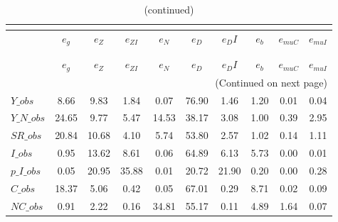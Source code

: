  
\begin{center}
\begin{longtable}{lccccccccc} 
\caption{VARIANCE DECOMPOSITION (in percent)}\\
 \label{Table:th_var_decomp_uncond}\\
\toprule 
$               $	 & 	 $        {e_g}$	 & 	 $        {e_Z}$	 & 	 $     {e_{ZI}}$	 & 	 $        {e_N}$	 & 	 $        {e_D}$	 & 	 $       {e_DI}$	 & 	 $        {e_b}$	 & 	 $    {e_{muC}}$	 & 	 $    {e_{muI}}$\\
\midrule \endfirsthead 
\caption{(continued)}\\
 \toprule \\ 
$               $	 & 	 $        {e_g}$	 & 	 $        {e_Z}$	 & 	 $     {e_{ZI}}$	 & 	 $        {e_N}$	 & 	 $        {e_D}$	 & 	 $       {e_DI}$	 & 	 $        {e_b}$	 & 	 $    {e_{muC}}$	 & 	 $    {e_{muI}}$\\
\midrule \endhead 
\midrule \multicolumn{10}{r}{(Continued on next page)} \\ \bottomrule \endfoot 
\bottomrule \endlastfoot 
$Y\_obs         $	 & 	         8.66	 & 	         9.83	 & 	         1.84	 & 	         0.07	 & 	        76.90	 & 	         1.46	 & 	         1.20	 & 	         0.01	 & 	         0.04 \\ 
$Y\_N\_obs      $	 & 	        24.65	 & 	         9.77	 & 	         5.47	 & 	        14.53	 & 	        38.17	 & 	         3.08	 & 	         1.00	 & 	         0.39	 & 	         2.95 \\ 
$SR\_obs        $	 & 	        20.84	 & 	        10.68	 & 	         4.10	 & 	         5.74	 & 	        53.80	 & 	         2.57	 & 	         1.02	 & 	         0.14	 & 	         1.11 \\ 
$I\_obs         $	 & 	         0.95	 & 	        13.62	 & 	         8.61	 & 	         0.06	 & 	        64.89	 & 	         6.13	 & 	         5.73	 & 	         0.00	 & 	         0.01 \\ 
$p\_I\_obs      $	 & 	         0.05	 & 	        20.95	 & 	        35.88	 & 	         0.01	 & 	        20.72	 & 	        21.90	 & 	         0.20	 & 	         0.00	 & 	         0.28 \\ 
$C\_obs         $	 & 	        18.37	 & 	         5.06	 & 	         0.42	 & 	         0.05	 & 	        67.01	 & 	         0.29	 & 	         8.71	 & 	         0.02	 & 	         0.09 \\ 
$NC\_obs        $	 & 	         0.91	 & 	         2.22	 & 	         0.16	 & 	        34.81	 & 	        55.17	 & 	         0.11	 & 	         4.89	 & 	         1.64	 & 	         0.07 \\ 

\end{longtable}
\end{center}
